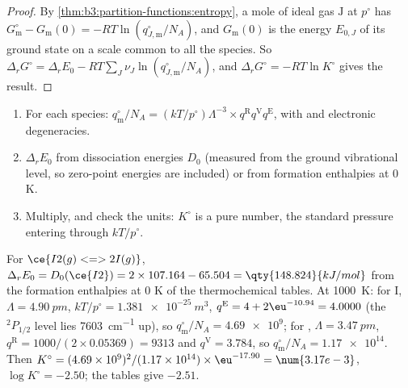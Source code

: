 \begin{proof}
By \cref{thm:b3:partition-functions:entropy}, a mole of ideal gas $\mathrm J$ at $p^\circ$ has
$G^\circ_{\mathrm m} - G_{\mathrm m}(0) = -RT\ln(q^\circ_{J,\mathrm m}/N_A)$, and $G_{\mathrm m}(0)$ is the energy $E_{0,J}$
of its ground state on a scale common to all the species. So $\Delta_rG^\circ =
\Delta_rE_0 - RT\sum_J\nu_J\ln(q^\circ_{J,\mathrm m}/N_A)$, and $\Delta_rG^\circ = -RT\ln K^\circ$ gives the
result.
\end{proof}

\begin{method}\label{met:b3:statistical-thermo-applied:k-stat}
\begin{enumerate}
  \item For each species: $q^\circ_{\mathrm m}/N_A = (kT/p^\circ)\Lambda^{-3}\times q^{\mathrm R}q^{\mathrm V}q^{\mathrm E}$, with
         and electronic degeneracies.
  \item $\Delta_rE_0$ from dissociation energies $D_0$ (measured from the ground
        vibrational level, so zero-point energies are included) or from
        formation enthalpies at 0 K.
  \item Multiply, and check the units: $K^\circ$ is a pure number, the standard
        pressure entering through $kT/p^\circ$.
\end{enumerate}
\end{method}

\begin{example}\label{ex:b3:statistical-thermo-applied:iodine}
For $\ce{I2(g) <=> 2 I(g)}$, $\Delta_rE_0 = D_0(\ce{I2}) = 2 \times 107.164 - 65.504 = \qty{148.824}{kJ/mol}$
from the formation enthalpies at 0 K of the thermochemical tables. At
\qty{1000}{K}: for I, $\Lambda = \qty{4.90}{pm}$, $kT/p^\circ = \qty{1.381e-25}{m^3}$, $q^{\mathrm E} = 4 +
2\eu^{-10.94} = 4.0000$ (the ${}^2P_{1/2}$ level lies \qty{7603}{cm^{-1}} up), so $q^\circ_{\mathrm m}/N_A = \num{4.69e9}$;
for , $\Lambda = \qty{3.47}{pm}$, $q^{\mathrm R} = 1000/(2 \times 0.05369) = 9313$ and $q^{\mathrm V} = 3.784$, so
$q^\circ_{\mathrm m}/N_A = \num{1.17e14}$. Then $K^\circ = (4.69\times10^9)^2/(1.17\times10^{14}) \times \eu^{-17.90} =
\num{3.17e-3}$, $\log K^\circ = -2.50$; the tables give $-2.51$.
\end{example}

